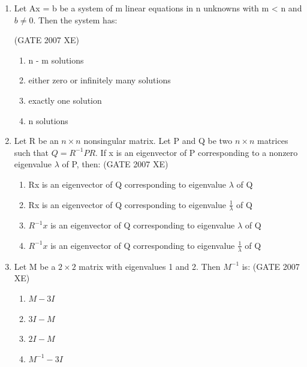 \documentclass[journal,cmex10]{IEEEtran}
\theoremstyle{remark}
\numberwithin{equation}{enumi}
\numberwithin{figure}{enumi}
\begin{document}
\begin{enumerate}
    \item Let Ax = b be a system of m linear equations in n unknowns with m < n and $b \neq 0$. Then the system has:
  
    \hfill{(GATE 2007 XE)}
    \begin{multicols}{4}
    \begin{enumerate}
        \item n - m  solutions
        \item either zero or infinitely many solutions
        \item exactly one solution
        \item n  solutions
    \end{enumerate}
\end{multicols}

    \item Let R be an $n \times n $ nonsingular matrix. Let P and Q be two  $n \times n $ matrices such that $ Q = R^{-1}PR $. If x  is an eigenvector of  P corresponding to a nonzero eigenvalue $\lambda$ of P, then:
    \hfill{(GATE 2007 XE)}
    \begin{multicols}{2}
    \begin{enumerate}
        \item Rx  is an eigenvector of Q  corresponding to eigenvalue $\lambda$ of  Q 
        \item  Rx  is an eigenvector of Q  corresponding to eigenvalue $ \frac{1}{\lambda} $ of Q 
        \item $R^{-1}x$  is an eigenvector of Q  corresponding to eigenvalue $\lambda$ of Q 
        \item $ R^{-1}x$ is an eigenvector of Q  corresponding to eigenvalue $ \frac{1}{\lambda} $ of Q 
    \end{enumerate}
\end{multicols}

    \item Let M  be a $2 \times 2$ matrix with eigenvalues 1 and 2. Then  $ M^{-1}$ is:
    \hfill{(GATE 2007 XE)}
    \begin{multicols}{4}
    \begin{enumerate}[label=\alph*)]
        \item $M - 3I$
        \item $3I - M$
        \item $2I - M$
        \item $M^{-1} - 3I$
    \end{enumerate}
\end{multicols}


\end{enumerate}
\end{document}
